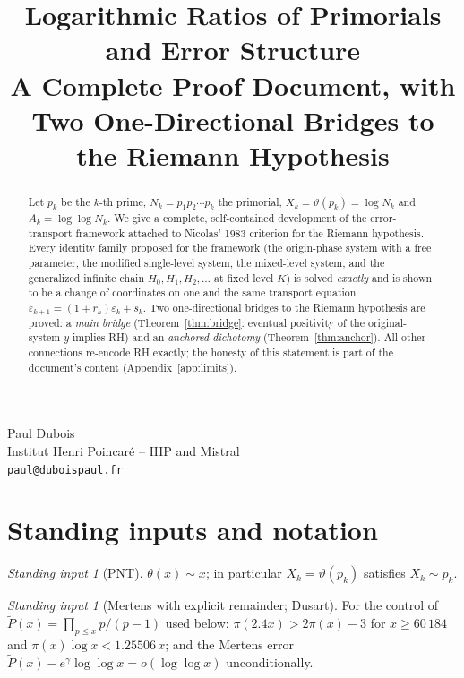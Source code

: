 \documentclass[11pt]{article}
\title{Logarithmic Ratios of Primorials and Error Structure\\
\large A Complete Proof Document, with Two One-Directional Bridges to the Riemann Hypothesis}
\author{}
\date{}
\makeatletter
\theoremstyle{remark}
\newtheorem{fact}[theorem]{Standing input}
\newcommand{\Nk}{N_k}
\newcommand{\Xk}{X_k}
\newcommand{\Ak}{A_k}
\newcommand{\rk}{r_k}
\newcommand{\eps}{\varepsilon}
\newcommand{\Ptil}{\widetilde P}
\newcommand{\gam}{\gamma}
\newcommand{\AuthorBlock}{%
\begin{center}
{\Large Paul Dubois}\\[6pt]
Institut Henri Poincar\'e -- IHP and Mistral\\[4pt]
\texttt{paul@duboispaul.fr}
\end{center}}
\makeatother
\begin{document}
\AuthorBlock
\vspace{2em}
\maketitle

\begin{abstract}
Let $p_k$ be the $k$-th prime, $\Nk=p_1p_2\cdots p_k$ the primorial,
$\Xk=\vartheta(p_k)=\log \Nk$ and $\Ak=\log\log \Nk$. We give a complete,
self-contained development of the error-transport framework attached to
Nicolas' 1983 criterion for the Riemann hypothesis. Every identity family
proposed for the framework (the origin-phase system with a free parameter, the
modified single-level system, the mixed-level system, and the generalized
infinite chain $H_0,H_1,H_2,\dots$ at fixed level $K$) is solved \emph{exactly}
and is shown to be a change of coordinates on one and the same transport
equation $\eps_{k+1}=(1+\rk)\eps_k+s_k$. Two one-directional bridges to the
Riemann hypothesis are proved: a \emph{main bridge} (Theorem~\ref{thm:bridge}:
eventual positivity of the original-system $y$ implies RH) and an \emph{anchored
dichotomy} (Theorem~\ref{thm:anchor}). All other connections re-encode RH
exactly; the honesty of this statement is part of the document's content
(Appendix~\ref{app:limits}).
\end{abstract}

\tableofcontents

\section{Standing inputs and notation}\label{sec:inputs}

\begin{fact}[PNT]\label{f:PNT}
$\theta(x)\sim x$; in particular $\Xk=\vartheta(p_k)$ satisfies $\Xk\sim p_k$.
\end{fact}

\begin{fact}[Mertens with explicit remainder; Dusart]\label{f:Mertens}
For the control of $\Ptil(x)=\prod_{p\le x}p/(p-1)$ used below:
$\pi(2.4x)>2\pi(x)-3$ for $x\ge 60\,184$ and $\pi(x)\log x<1.25506\,x$; and the
Mertens error $\Ptil(x)-e^\gam\log\log x=o(\log\log x)$ unconditionally.
\end{fact}
\end{document}
